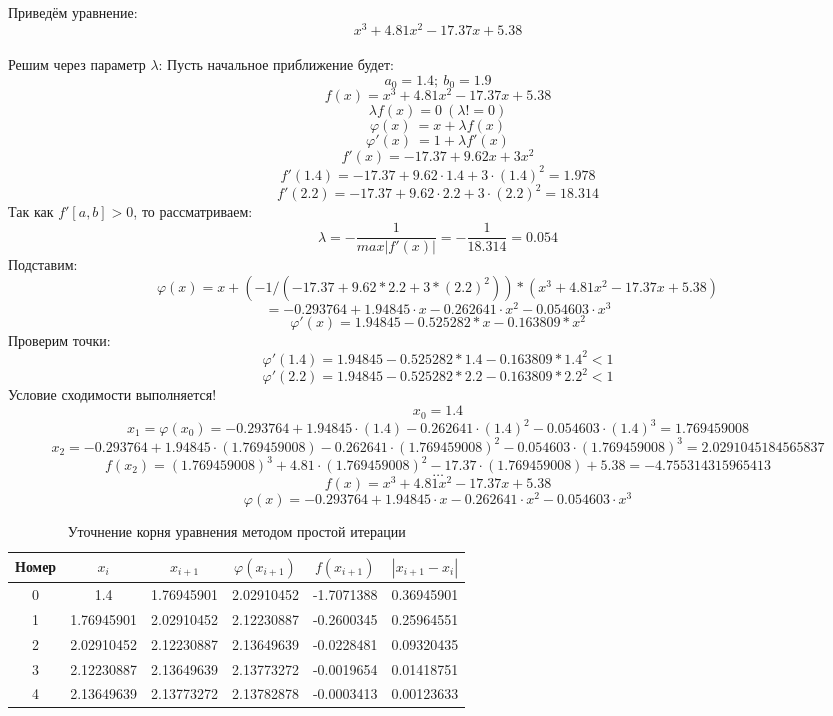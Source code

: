 \documentclass{article}
\begin{document}
            Приведём уравнение:
            \[
            x^3+4.81x^2-17.37x+5.38
            \]
            \\
            Решим через параметр $\lambda$:
            Пусть начальное приближение будет:
            \[    
            a_0 = 1.4;\ b_0 = 1.9\]
            \[
            f(x) = x^3+4.81x^2-17.37x+5.38 \]
            \[\lambda f(x) = 0\ (\lambda!=0)\]
            \[\varphi(x)\ = x+ \lambda f(x) \]
            \[\varphi'(x)\ = 1+ \lambda f'(x) \]
            \[f'(x) =-17.37 + 9.62 x + 3 x^2\]
            \[f'(1.4) = -17.37 + 9.62 \cdot 1.4 + 3\cdot(1.4)^2=1.978\]
            \[f'(2.2) = -17.37 + 9.62 \cdot 2.2 + 3\cdot(2.2)^2=18.314\]
            Так как $f'[a, b] > 0$, то рассматриваем:
            \[
            \lambda = - \frac{1}{max|f'(x)|} = -\frac{1}{18.314} = 0.054\] 
            Подставим:
            \[\varphi(x) = x+(-1/(-17.37 + 9.62 * 2.2 + 3 * (2.2)^2))*(x^3+4.81x^2-17.37x+5.38) \] 
            \[= -0.293764 + 1.94845 \cdot x - 0.262641 \cdot x^2 - 0.054603 \cdot x^3 \]
            \[\varphi'(x) = 1.94845 - 0.525282 * x - 0.163809*x^2 \]
            Проверим точки:
            \[\varphi'(1.4) = 1.94845 - 0.525282 * 1.4 - 0.163809*1.4^2 < 1\]
            \[\varphi'(2.2) = 1.94845 - 0.525282 * 2.2 - 0.163809*2.2^2  < 1\]
            Условие сходимости выполняется!
            \[x_0 = 1.4 \]
            \[x_1 = \varphi(x_0) = -0.293764 + 1.94845 \cdot (1.4) - 0.262641 \cdot (1.4)^2 - 0.054603 \cdot (1.4)^3 = 1.769459008\]
            \[x_2 = -0.293764 + 1.94845 \cdot (1.769459008) - 0.262641 \cdot (1.769459008)^2 - 0.054603 \cdot (1.769459008)^3 = 2.0291045184565837\] 
            \[f(x_2) = (1.769459008)^3+4.81 \cdot (1.769459008)^2-17.37 \cdot (1.769459008)+5.38 = -4.755314315965413\]
            $$\dots$$
            \[
            f(x) = x^3+4.81x^2-17.37x+5.38 \]
            \[\varphi(x)=  -0.293764 + 1.94845 \cdot x - 0.262641 \cdot x^2 - 0.054603 \cdot x^3 \]


            \begin{table}[h]
            \centering
                  \begin{tabular}{|*{6}{c|}}
                        \hline
                        Номер & $x_i$ & $x_{i+1}$ & $\varphi(x_{i+1})$& $f(x_{i+1})$& $|x_{i+1} - x_i|$  \\ \hline
                        0 & 1.4        & 1.76945901 & 2.02910452 & -1.7071388 & 0.36945901 \\  \hline
                        1 & 1.76945901 & 2.02910452 & 2.12230887 & -0.2600345 & 0.25964551 \\ \hline
                        2 & 2.02910452 & 2.12230887 & 2.13649639 & -0.0228481 & 0.09320435 \\ \hline
                        3 & 2.12230887 & 2.13649639 & 2.13773272 & -0.0019654 & 0.01418751 \\ \hline
                        4 & 2.13649639 & 2.13773272 & 2.13782878 & -0.0003413 & 0.00123633 \\ \hline
                  \end{tabular}
            \caption{Уточнение корня уравнения методом простой итерации}
            \end{table}
\end{document}
